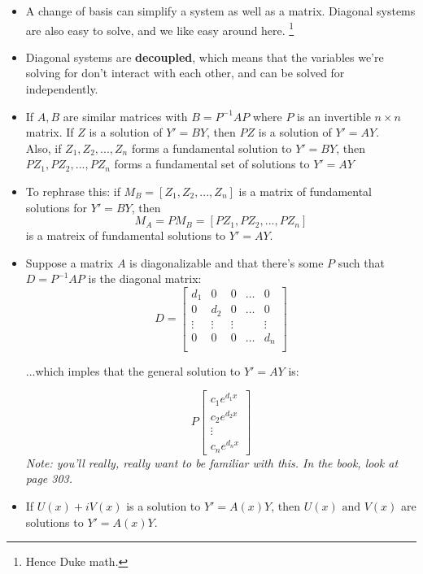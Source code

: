\documentclass[10pt,letterpaper]{article}
\begin{document}
\begin{itemize}

\item A change of basis can simplify a system as well as a matrix. Diagonal systems are also easy to solve, and we like easy around here. \footnote{Hence Duke math.} 

\item Diagonal systems are \textbf{decoupled}, which means that the variables we're solving for don't interact with each other, and can be solved for independently. 


\item If $A,B$ are similar matrices with $B=P^{-1}AP$ where $P$ is an invertible $n\times n$ matrix. If $Z$ is a solution of $Y'=BY$, then $PZ$ is a solution of $Y'=AY$. \\
Also, if $Z_1, Z_2, ..., Z_n$ forms a fundamental solution to $Y'=BY$, then $PZ_1,PZ_2,...,PZ_n$ forms a fundamental set of solutions to $Y'=AY$

\item To rephrase this: if $M_B= [Z_1,  Z_2, ..., Z_n]$ is a matrix of fundamental solutions for $Y'=BY$, then 
$$M_A = PM_B = [PZ_1, PZ_2,...,PZ_n]$$ 
is a matreix of fundamental solutions to $Y'=AY$. 

\item Suppose a matrix $A$ is diagonalizable and that there's some $P$ such that $D=P^{-1}AP$ is the diagonal matrix: 
$$D = \left[
\begin{array}{ccccc}
d_1 & 0 & 0 & \dots & 0  \\ 
0 & d_2 & 0 & \dots & 0 \\ 
\vdots & \vdots & \vdots & & \vdots \\ 
0 & 0 & 0 & \dots & d_n \\
\end{array}
\right]$$

...which imples that the general solution to $Y'=AY$ is: 

$$ P\left[
\begin{array}{c}
c_1e^{d_1x} \\
c_2e^{d_2x} \\ 
\vdots \\ 
c_ne^{d_nx}
\end{array}
\right]
$$
\textit{Note: you'll really, really want to be familiar with this. In the book, look at page 303.}

\item If $U(x) + iV(x)$ is a solution to $Y'=A(x)Y$, then $U(x) \mbox{ and } V(x)$ are solutions to $Y'=A(x)Y$. 


\end{itemize}
\end{document}
